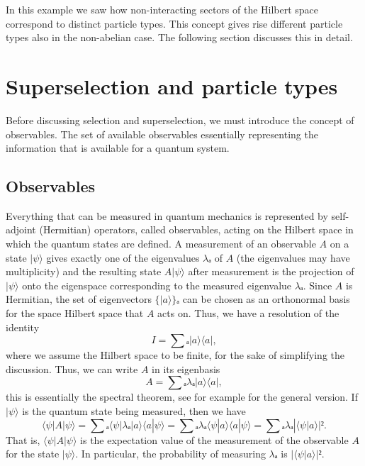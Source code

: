 In this example we saw how non-interacting sectors of the Hilbert space correspond to distinct particle types. This concept gives rise different particle types also in the non-abelian case. The following section discusses this in detail.



































\section{Superselection and particle types}\label{sec:observables}

Before discussing selection and superselection, we must introduce the concept of observables. The set of available observables essentially representing the information that is available for a quantum system.

\subsection{Observables}\label{sec:global vs relative phase}

Everything that can be measured in quantum mechanics is represented by self-adjoint (Hermitian) operators, called observables, acting on the Hilbert space in which the quantum states are defined. A measurement of an observable $A$ on a state $|ψ⟩$ gives exactly one of the eigenvalues $λₐ$ of $A$ (the eigenvalues may have multiplicity) and the resulting state $A|ψ⟩$ after measurement is the projection of $|ψ⟩$ onto the eigenspace corresponding to the measured eigenvalue $λₐ$. Since $A$ is Hermitian, the set of eigenvectors $\{|a⟩\}ₐ$ can be chosen as an orthonormal basis for the space Hilbert space that $A$ acts on. Thus, we have a resolution of the identity
\begin{equation}
  I = ∑ₐ |a⟩⟨a|,
\end{equation}
where we assume the Hilbert space to be finite, for the sake of simplifying the discussion. Thus, we can write $A$ in its eigenbasis
\begin{equation}
  A = ∑ₐ λₐ |a⟩⟨a|,
\end{equation}
this is essentially the spectral theorem, see for example \cite{reed-simon} for the general version. If $|ψ⟩$ is the quantum state being measured, then we have
\begin{equation}
  ⟨ψ|A|ψ⟩
  = ∑ₐ ⟨ψ|λₐ|a⟩⟨a|ψ⟩
  = ∑ₐ λₐ ⟨ψ|a⟩⟨a|ψ⟩
  = ∑ₐ λₐ |⟨ψ|a⟩|².
\end{equation}
That is, $⟨ψ|A|ψ⟩$ is the expectation value of the measurement of the observable $A$ for the state $|ψ⟩$. In particular, the probability of measuring $λₐ$ is $|⟨ψ|a⟩|²$.

